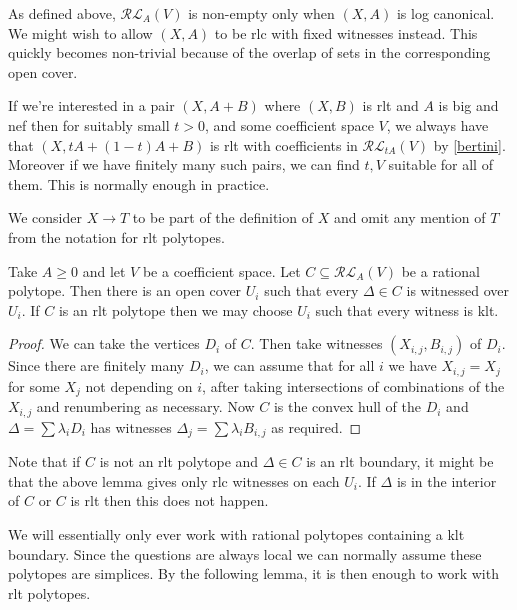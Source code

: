 \documentclass[a4paper,12pt]{amsart}
\begin{document}
	
	\begin{remark}
		
		As defined above, $\mathcal{RL}_{A}(V)$ is non-empty only when $(X,A)$ is log canonical. We might wish to allow $(X,A)$ to be rlc with fixed witnesses instead. This quickly becomes non-trivial because of the overlap of sets in the corresponding open cover.
		
		If we're interested in a pair $(X,A+B)$ where $(X,B)$ is rlt and $A$ is big and nef then for suitably small $t>0$, and some coefficient space $V$, we always have that $(X,tA+(1-t)A+B)$ is rlt with coefficients in $\mathcal{RL}_{tA}(V)$ by \autoref{bertini}. Moreover if we have finitely many such pairs, we can find $t,V$ suitable for all of them. This is normally enough in practice.
		
	\end{remark}

	We consider $X \to T$ to be part of the definition of $X$ and omit any mention of $T$ from the notation for rlt polytopes.
	
	\begin{lemma}
		Take $A \geq 0$ and let $V$ be a coefficient space. Let $C \subseteq \mathcal{RL}_{A}(V)$ be a rational polytope. Then there is an open cover $U_{i}$ such that every $\Delta \in C$ is witnessed over $U_{i}$. If $C$ is an rlt polytope then we may choose $U_{i}$ such that every witness is klt.
	\end{lemma}
	\begin{proof}
		We can take the vertices $D_{i}$ of $C$. Then take witnesses $(X_{i,j}, B_{i,j})$ of $D_{i}$. Since there are finitely many $D_{i}$, we can assume that for all $i$ we have $X_{i,j}=X_{j}$ for some $X_{j}$ not depending on $i$, after taking intersections of combinations of the $X_{i,j}$ and renumbering as necessary. Now $C$ is the convex hull of the $D_{i}$ and $\Delta= \sum \lambda_{i}D_{i}$ has witnesses $\Delta_{j}= \sum \lambda_{i}B_{i,j}$ as required.
	\end{proof}

	Note that if $C$ is not an rlt polytope and $\Delta \in C$ is an rlt boundary, it might be that the above lemma gives only rlc witnesses on each $U_{i}$. If $\Delta$ is in the interior of $C$ or $C$ is rlt then this does not happen.
	
	We will essentially only ever work with rational polytopes containing a klt boundary. Since the questions are always local we can normally assume these polytopes are simplices. By the following lemma, it is then enough to work with rlt polytopes.
	
\end{document}
